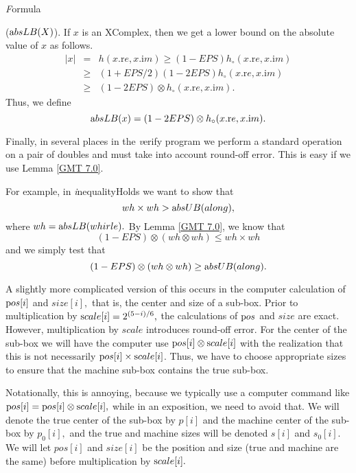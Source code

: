 {\textit Formula} \label{GMT 7.1}{(${\textrm absLB}(X)$).
If $x$ is an XComplex, then
we get a lower bound on the absolute value of $x$ as follows.
\begin{eqnarray*}
|x|& =& h(x.{\mathrm re},x.{\mathrm im}) \ge (1 - EPS) h_{\circ} (x.{\mathrm re},x.{\mathrm im})\\
&\ge& (1 + EPS/2) (1 - 2EPS) h_{\circ} (x.{\mathrm
re},x.{\mathrm im})\\
&\ge& (1 - 2EPS) \otimes h_{\circ} (x.{\mathrm re},x.{\mathrm im}).
\end{eqnarray*}
Thus, we define 
$${\textrm absLB}(x) = (1 - 2EPS) \otimes h_{\circ} (x.{\mathrm re},x.{\mathrm im}).$$ 

Finally, in several places in the {\textit verify} program we perform a standard operation on a pair of doubles and must take into account round-off error.  This is easy if we use Lemma \ref{GMT 7.0}.

For example, in {\textit inequalityHolds} we want to show that $$wh \times wh  > {\textrm absUB}{\textrm (along),}$$ where $wh =
{\textrm absLB}{\textrm (whirle)}.$   
By Lemma \ref{GMT 7.0}, we know that $$(1 - EPS) \otimes (wh \otimes wh) \le wh \times wh$$ and we simply test that 
$$(1 - EPS) \otimes  (wh \otimes wh) \ge {\textrm absUB}{\textrm (along)}.$$

A slightly more complicated version of this occurs in the computer calculation of ${\textrm pos}[i]$ and $size[i],$ that is, the center and size of a sub-box.  Prior to multiplication by ${\textrm scale}[i] = 2 ^{(5 - i)/6},$  the calculations of ${\textrm pos}$ and $size$ are exact.  However, multiplication by $scale$ introduces round-off error.  For the center of the sub-box we will have the computer use ${\textrm pos}[i] \otimes {\textrm scale}[i]$ with the realization that this is not necessarily ${\textrm pos}[i] \times {\textrm scale}[i]$.   Thus, we have to choose appropriate sizes to ensure that the machine sub-box contains the true sub-box.  

Notationally, this is annoying, because we typically use a computer command like ${\textrm pos}[i] = {\textrm pos}[i] \otimes {\textrm scale}[i],$ while in an exposition, we need to avoid that.  We will denote the true center of the sub-box by $p[i]$ and the machine center of the sub-box by $p_0[i],$ and the true and machine sizes will be denoted $s[i]$ and $s_0[i].$  We will let $pos[i]$ and $size[i]$ be the position and size (true and machine are the same) before multiplication by ${\textrm scale}[i].$

}
